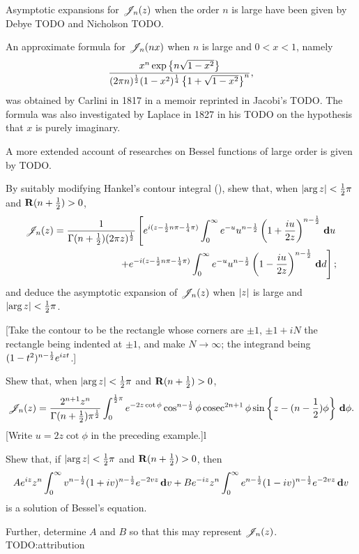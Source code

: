 \documentclass{book}
\begin{document}
Asymptotic expansions for $\mathscr{J}_n(z)$ when the order $n$ is large have
been given by Debye TODO and Nicholson TODO.

An approximate formula for $\mathscr{J}_n(nx)$ when $n$ is large and $0<x<1$,
namely
$$
\frac{ x^n \exp\left\{ n \sqrt{1-x^2} \right\}}{ (2\pi n)^{\frac{1}{2}} (1-x^2)^{\frac{1}{4}} \left\{ 1 +
    \sqrt{1 - x^2} \right\}^n},
$$
was obtained by Carlini in 1817 in a memoir reprinted in Jacobi's
TODO.
The formula was also investigated by Laplace in 1827 in his TODO on
the hypothesis that $x$ is purely imaginary.

A more extended account of researches on Bessel functions of large
order is given by TODO.
\begin{wandwexample}
  By suitably modifying Hankel's contour integral
  (), shew that, when
  $\left| \arg z \right| < \frac{1}{2} \pi$ and
  $\operatorname{\mathbf{R}}(n+\frac{1}{2}) > 0$,
  \begin{align*}
    \mathscr{J}_n(z)
    =
    \frac{1}{\Gamma(n+\frac{1}{2}) (2\pi z)^{\frac{1}{2}}}
    \left[
      e^{i(z - \frac{1}{2} n \pi - \frac{1}{4} \pi)}
      \int_0^{\infty}
      e^{-u}
      u^{n-\frac{1}{2}}
      \left( 1 + \frac{iu}{2z} \right)^{n-\frac{1}{2}}
      \, \mathbf{d} u
    \right.
    \\
    \left.
      +
      e^{-i(z - \frac{1}{2} n \pi - \frac{1}{4}\pi)}
      \int_0^{\infty}
      e^{-u}
      u^{n-\frac{1}{2}}
      \left( 1 - \frac{iu}{2z} \right)^{n-\frac{1}{2}}
      \, \mathbf{d} d
    \right];
  \end{align*}
  and deduce the asymptotic expansion of $\mathscr{J}_n(z)$ when
  $\left| z \right|$ is large and
  $\left| \arg z \right| < \frac{1}{2} \pi$.

  [Take the contour to be the rectangle whose corners are
  $\pm 1$, $\pm 1 + iN$ the rectangle being indented at $\pm 1$,
  and make $N \rightarrow \infty$; the integrand being
  $(1-t^2)^{n-\frac{1}{2}} e^{izt}$.]
\end{wandwexample}
\begin{wandwexample}
  Shew that, when $\left| \arg z \right| < \frac{1}{2} \pi$ and
  $\operatorname{\mathbf{R}}(n+\frac{1}{2}) > 0$,
  $$
  \mathscr{J}_n(z)
  =
  \frac{2^{n+1} z^n}{\Gamma(n+\frac{1}{2}) \pi^{\frac{1}{2}}}
  \int_0^{\frac{1}{2}\pi}
  e^{-2z\cot\phi}
  \cos^{n-\frac{1}{2}}\phi
  \operatorname{cosec}^{2n+1}\phi
  \sin\left\{ z - (n-\frac{1}{2})\phi \right\}
  \, \mathbf{d} \phi.
  $$
  [Write $u = 2z\cot\phi$ in the preceding example.]l
\end{wandwexample}
\begin{wandwexample}
  Shew that, if $\left| \arg z \right| < \frac{1}{2} \pi$ and
  $\operatorname{\mathbf{R}}(n+\frac{1}{2}) > 0$, then
  $$
  A e^{iz} z^n
  \int_0^{\infty}
  v^{n-\frac{1}{2}}
  (1+iv)^{n-\frac{1}{2}}
  e^{-2vz}
  \, \mathbf{d} v
  +
  B e^{-iz} z^n
  \int_0^{\infty}
  e^{n-\frac{1}{2}}
  (1-iv)^{n-\frac{1}{2}}
  e^{-2vz}
  \, \mathbf{d} v
  $$
  is a solution of Bessel's equation.

  Further, determine $A$ and $B$ so that this may represent
  $\mathscr{J}_n(z)$.
  TODO:attribution
\end{wandwexample}
\end{document}
